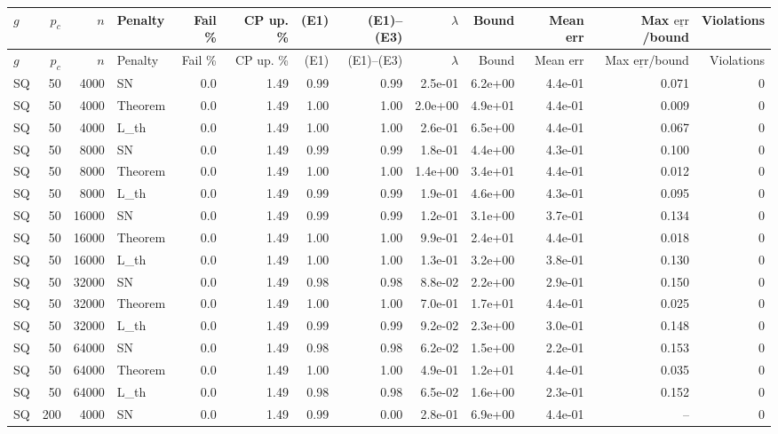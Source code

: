 \begin{tabular}{lrrlrrrrrrrrr}
\hline
$g$ & $p_c$ & $n$ & Penalty & Fail \% & CP up. \% & (E1) & (E1)--(E3) & $\lambda$ & Bound & Mean err & Max $\underline{\mathrm{err}}$/bound & Violations \\
\hline
\endfirsthead
\hline
$g$ & $p_c$ & $n$ & Penalty & Fail \% & CP up. \% & (E1) & (E1)--(E3) & $\lambda$ & Bound & Mean err & Max $\underline{\mathrm{err}}$/bound & Violations \\
\hline
\endhead
SQ & 50 & 4000 & SN & 0.0 & 1.49 & 0.99 & 0.99 & 2.5e-01 & 6.2e+00 & 4.4e-01 & 0.071 & 0 \\
SQ & 50 & 4000 & Theorem & 0.0 & 1.49 & 1.00 & 1.00 & 2.0e+00 & 4.9e+01 & 4.4e-01 & 0.009 & 0 \\
SQ & 50 & 4000 & L\_th & 0.0 & 1.49 & 1.00 & 1.00 & 2.6e-01 & 6.5e+00 & 4.4e-01 & 0.067 & 0 \\
SQ & 50 & 8000 & SN & 0.0 & 1.49 & 0.99 & 0.99 & 1.8e-01 & 4.4e+00 & 4.3e-01 & 0.100 & 0 \\
SQ & 50 & 8000 & Theorem & 0.0 & 1.49 & 1.00 & 1.00 & 1.4e+00 & 3.4e+01 & 4.4e-01 & 0.012 & 0 \\
SQ & 50 & 8000 & L\_th & 0.0 & 1.49 & 0.99 & 0.99 & 1.9e-01 & 4.6e+00 & 4.3e-01 & 0.095 & 0 \\
SQ & 50 & 16000 & SN & 0.0 & 1.49 & 0.99 & 0.99 & 1.2e-01 & 3.1e+00 & 3.7e-01 & 0.134 & 0 \\
SQ & 50 & 16000 & Theorem & 0.0 & 1.49 & 1.00 & 1.00 & 9.9e-01 & 2.4e+01 & 4.4e-01 & 0.018 & 0 \\
SQ & 50 & 16000 & L\_th & 0.0 & 1.49 & 1.00 & 1.00 & 1.3e-01 & 3.2e+00 & 3.8e-01 & 0.130 & 0 \\
SQ & 50 & 32000 & SN & 0.0 & 1.49 & 0.98 & 0.98 & 8.8e-02 & 2.2e+00 & 2.9e-01 & 0.150 & 0 \\
SQ & 50 & 32000 & Theorem & 0.0 & 1.49 & 1.00 & 1.00 & 7.0e-01 & 1.7e+01 & 4.4e-01 & 0.025 & 0 \\
SQ & 50 & 32000 & L\_th & 0.0 & 1.49 & 0.99 & 0.99 & 9.2e-02 & 2.3e+00 & 3.0e-01 & 0.148 & 0 \\
SQ & 50 & 64000 & SN & 0.0 & 1.49 & 0.98 & 0.98 & 6.2e-02 & 1.5e+00 & 2.2e-01 & 0.153 & 0 \\
SQ & 50 & 64000 & Theorem & 0.0 & 1.49 & 1.00 & 1.00 & 4.9e-01 & 1.2e+01 & 4.4e-01 & 0.035 & 0 \\
SQ & 50 & 64000 & L\_th & 0.0 & 1.49 & 0.98 & 0.98 & 6.5e-02 & 1.6e+00 & 2.3e-01 & 0.152 & 0 \\
SQ & 200 & 4000 & SN & 0.0 & 1.49 & 0.99 & 0.00 & 2.8e-01 & 6.9e+00 & 4.4e-01 & -- & 0 \\

\end{tabular}

